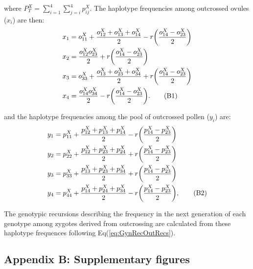 \documentclass{article}
\newcommand\numberthis{\addtocounter{equation}{1}\tag{\theequation}}
\begin{document}
\noindent where $P^X_T = \sum_{i=1}^{4}\sum_{j=i}^{4} p^X_{ij}$. The haplotype frequencies among outcrossed ovules ($x_i$) are then:
\begin{align*} 
    x_{1} &= o^X_{11} + \frac{o^X_{12} + o^X_{13} + o^X_{14}}{2} - r \bigg( \frac{o^X_{14} - o^X_{23}}{2} \bigg)  \\
    x_{2} &= \frac{o^X_{12} o^X_{23}}{2} + r \bigg( \frac{o^X_{14} - o^X_{23}}{2} \bigg) \\
    x_{3} &= o^X_{33} + \frac{o^X_{13} + o^X_{23} + o^X_{34}}{2} + r \bigg( \frac{o^X_{14} - o^X_{23}}{2} \bigg)  \\
    x_{4} &= \frac{o^X_{14} o^X_{34}}{2} - r \bigg( \frac{o^X_{14} - o^X_{23}}{2} \bigg).  \numberthis
\end{align*}

\noindent and the haplotype frequencies among the pool of outcrossed pollen ($y_i$) are:
\begin{align*} 
    y_{1} &= p^X_{11} + \frac{p^X_{12} + p^X_{13} + p^X_{14}}{2} - r \bigg( \frac{p^X_{14} - p^X_{23}}{2} \bigg)  \\
    y_{2} &= p^X_{22} + \frac{p^X_{12} + p^X_{23} + p^X_{24}}{2} + r \bigg( \frac{p^X_{14} - p^X_{23}}{2} \bigg)  \\
    y_{3} &= p^X_{33} + \frac{p^X_{13} + p^X_{23} + p^X_{34}}{2} + r \bigg( \frac{p^X_{14} - p^X_{23}}{2} \bigg)  \\
    y_{4} &= p^X_{44} + \frac{p^X_{14} + p^X_{24} + p^X_{34}}{2} - r \bigg( \frac{p^X_{14} - p^X_{23}}{2} \bigg),  \numberthis
\end{align*}

\noindent The genotypic recursions describing the frequency in the next generation of each genotype among zygotes derived from outcrossing are calculated from these haplotype frequences following Eq(\ref{eq:GynRecOutRecs}).

\newpage{}













\subsection*{Appendix B: Supplementary figures}
\renewcommand{\theequation}{B\arabic{equation}}
\setcounter{equation}{0}
\renewcommand{\thefigure}{S\arabic{figure}}
\setcounter{figure}{0}
\end{document}
